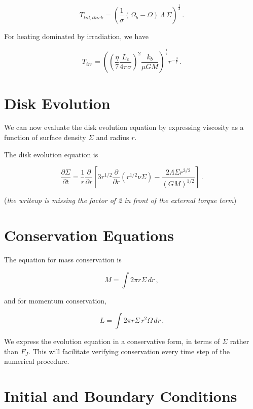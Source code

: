 \documentclass{article}
\begin{document}
\begin{equation}
T_{tid,thick} = \left(\frac{1}{\sigma}(\Omega_b - \Omega)\,\Lambda\,\Sigma\right)^\frac{1}{4}\,.
\end{equation}

For heating dominated by irradiation, we have

\begin{equation}
T_{irr} = \left(\left(\frac{\eta}{7}\frac{L_c}{4\pi\sigma}\right)^2 \frac{k_b}{\mu G M}\right)^\frac{1}{7} r^{-\frac{3}{7}}\,.
\end{equation}

\section{Disk Evolution}

We can now evaluate the disk evolution equation by expressing viscosity as a function of surface density $\Sigma$ and radius $r$.

The disk evolution equation is

\begin{equation} \label{eq:diskev}
\frac{\partial \Sigma}{\partial t} = \frac{1}{r} \frac{\partial}{\partial r} \left[3 r^{1/2} \frac{\partial}{\partial r} \left(r^{1/2} \nu \Sigma\right) - \frac{2 \Lambda \Sigma r^{3/2}}{(G M)^{1/2}}\right]\,.
\end{equation}

(\textit{the writeup is missing the factor of 2 in front of the external torque term})


\section{Conservation Equations}

The equation for mass conservation is

\begin{equation}
M = \int 2\pi r \Sigma\, dr\,,
\end{equation}

and for momentum conservation,

\begin{equation}
\textit{L} = \int2\pi r \Sigma\, r^2 \Omega\, dr\,.
\end{equation}

We express the evolution equation in a conservative form, in terms of $\Sigma$ rather than $F_J$. This will facilitate verifying conservation every time step of the numerical procedure.

\section{Initial and Boundary Conditions}
\end{document}
